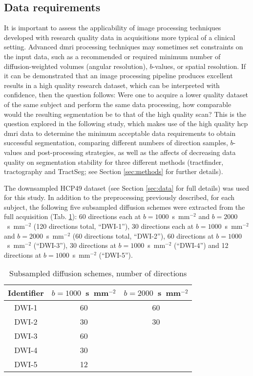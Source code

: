 \subsection{Data requirements}\label{sec:ismrmdiff}

It is important to assess the applicability of image processing techniques developed with research quality data in acquisitions more typical of a clinical setting.
Advanced \gls{dmri} processing techniques may sometimes set constraints on the input data, such as a recommended or required minimum number of diffusion-weighted volumes (angular resolution), $b$-values, or spatial resolution.
If it can be demonstrated that an image processing pipeline produces excellent results in a high quality research dataset, which can be interpreted with confidence, then the question follows:
Were one to acquire a lower quality dataset of the same subject and perform the same data processing, how comparable would the resulting segmentation be to that of the high quality scan?
This is the question explored in the following study, which makes use of the high quality \gls{hcp} \gls{dmri} data to determine the minimum acceptable data requirements to obtain successful segmentation, comparing different numbers of direction samples, $b$-values and post-processing strategies, as well as the affects of decreasing data quality on segmentation stability for three different methods (tractfinder, tractography and TractSeg; see Section \ref{sec:methods} for further details).


The downsampled HCP49 dataset (see Section \ref{sec:data} for full details) was used for this study.
In addition to the preprocessing previously described, for each subject, the following five subsampled diffusion schemes were extracted from the full acquisition (Tab. \ref{tab:subschemes}):
60 directions each at $b=1000$~s~mm$^{-2}$ and $b=2000$~s~mm$^{-2}$ (120 directions total, ``DWI-1”), 30 directions each at $b=1000$~s~mm$^{-2}$ and $b=2000$~s~mm$^{-2}$ (60 directions total, ``DWI-2”), 60 directions at $b=1000$~s~mm$^{-2}$ (``DWI-3”), 30 directions at $b=1000$~s~mm$^{-2}$ (``DWI-4”) and 12 directions at $b=1000$~s~mm$^{-2}$ (``DWI-5”).

\begin{table}
  \centering
  \begin{tabular}{c c c} \toprule
    Identifier & $b=1000$~s~mm$^{-2}$ & $b=2000$~s~mm$^{-2}$ \\
    \midrule
    DWI-1 & 60 & 60 \\
    DWI-2 & 30 & 30 \\
    DWI-3 & 60 &    \\
    DWI-4 & 30 &    \\
    DWI-5 & 12 &    \\ \bottomrule
  \end{tabular}
  \caption[Subsampled diffusion schemes for data stability analysis]{Subsampled diffusion schemes, number of directions}
  \label{tab:subschemes}
\end{table}

